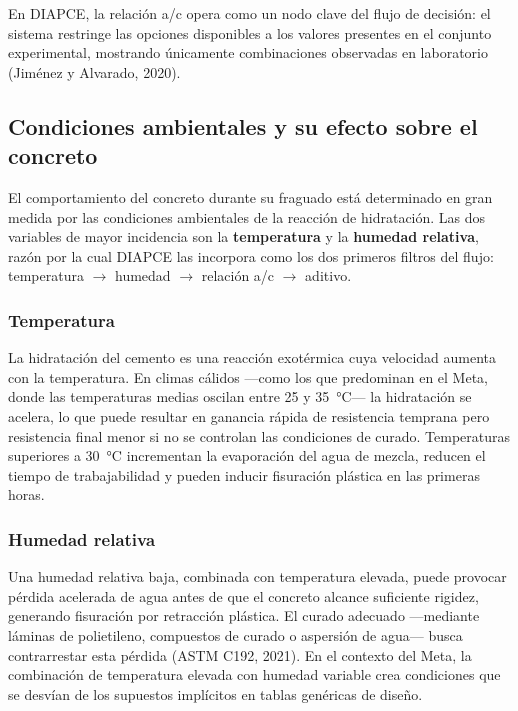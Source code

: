 \documentclass[12pt, letterpaper]{article}
\begin{document}
En DIAPCE, la relación a/c opera como un nodo clave del flujo de decisión: el sistema restringe las opciones disponibles a los valores presentes en el conjunto experimental, mostrando únicamente combinaciones observadas en laboratorio (Jiménez y Alvarado, 2020).

\subsection{Condiciones ambientales y su efecto sobre el concreto}

El comportamiento del concreto durante su fraguado está determinado en gran medida por las condiciones ambientales de la reacción de hidratación. Las dos variables de mayor incidencia son la \textbf{temperatura} y la \textbf{humedad relativa}, razón por la cual DIAPCE las incorpora como los dos primeros filtros del flujo: temperatura $\rightarrow$ humedad $\rightarrow$ relación a/c $\rightarrow$ aditivo.

\subsubsection*{Temperatura}

La hidratación del cemento es una reacción exotérmica cuya velocidad aumenta con la temperatura. En climas cálidos ---como los que predominan en el Meta, donde las temperaturas medias oscilan entre 25 y 35~°C--- la hidratación se acelera, lo que puede resultar en ganancia rápida de resistencia temprana pero resistencia final menor si no se controlan las condiciones de curado. Temperaturas superiores a 30~°C incrementan la evaporación del agua de mezcla, reducen el tiempo de trabajabilidad y pueden inducir fisuración plástica en las primeras horas.

\subsubsection*{Humedad relativa}

Una humedad relativa baja, combinada con temperatura elevada, puede provocar pérdida acelerada de agua antes de que el concreto alcance suficiente rigidez, generando fisuración por retracción plástica. El curado adecuado ---mediante láminas de polietileno, compuestos de curado o aspersión de agua--- busca contrarrestar esta pérdida (ASTM C192, 2021). En el contexto del Meta, la combinación de temperatura elevada con humedad variable crea condiciones que se desvían de los supuestos implícitos en tablas genéricas de diseño.
\end{document}
